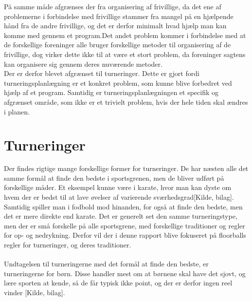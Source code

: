 På samme måde afgrænses der fra organisering af frivillige, da det ene af problemerne i forbindelse med frivillige stammer fra mangel på en hjælpende hånd fra de andre frivillige, og det er derfor minimalt hvad hjælp man kan komme med gennem et program.Det andet problem kommer i forbindelse med at de forskellige foreninger alle bruger forskellige metoder til organisering af de frivillige, dog virker dette ikke til at være et stort problem, da foreninger sagtens kan organisere sig gennem deres nuværende metoder. \\
Der er derfor blevet afgrænset til turneringer. Dette er gjort fordi turneringsplanlægning er et konkret problem, som kunne blive forbedret ved hjælp af et program. Samtidig er turneringsplanlægningen et specifik og afgrænset område, som ikke er et trivielt problem, hvis der hele tiden skal ændres i planen.


\section{Turneringer}
Der findes rigtige mange forskellige former for turneringer. De har næsten alle det samme formål at finde den bedste i sportsgrenen, men de bliver udført på forskellige måder. Et eksempel kunne være i karate, hvor man kan dyste om hvem der er bedst til at lave øvelser af varierende sværhedsgrad[Kilde, bilag]. Samtidig spiller man i fodbold mod hinanden, for også at finde den bedste, men det er mere direkte end karate. Det er generelt set den samme turneringstype, men der er små forskelle på alle sportsgrene, med forskellige traditioner og regler for op- og nedrykning. Derfor vil der i denne rapport blive fokuseret på floorballs regler for turneringer, og deres traditioner. 
\\\\
Undtagelsen til turneringerne med det formål at finde den bedste, er turneringerne for børn. Disse handler mest om at børnene skal have det sjovt, og lære sporten at kende, så de får typisk ikke point, og der er derfor ingen reel vinder [Kilde, bilag]. 


